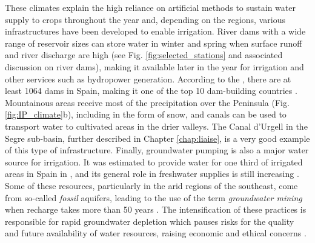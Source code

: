 These climates explain the high reliance on artificial methods to sustain water supply to crops throughout the year and, depending on the regions, various infrastructures have been developed to enable irrigation. 
River dams with a wide range of reservoir sizes can store water in winter and spring when surface runoff and river discharge are high (see Fig. \ref{fig:selected_stations} and associated discussion on river dams), making it available later in the year for irrigation and other services such as hydropower generation.
According to the \citet{ICOLD2020}, there are at least 1064 dams in Spain, making it one of the top 10 dam-building countries \citep{sadki_implementation_2023}.
Mountainous areas receive most of the precipitation over the Peninsula (Fig. \ref{fig:IP_climate}b), including in the form of snow, and canals can be used to transport water to cultivated areas in the drier valleys. The Canal d'Urgell \citep{farran_urgell_2024} in the Segre sub-basin, further described in Chapter \ref{chap:liaise}, is a very good example of this type of infrastructure.
Finally, groundwater pumping is also a major water source for irrigation. It was estimated to provide water for one third of irrigated areas in Spain in \citet{de_stefano_groundwater_2015}, and its general role in freshwater supplies is still increasing \citep{llamas_groundwater_2015}. Some of these resources, particularly in the arid regions of the southeast, come from so-called \textit{fossil} aquifers, leading to the use of the term \textit{groundwater mining} when recharge takes more than 50 years \citep{custodio_groundwater_2016}.
The intensification of these practices is responsible for rapid groundwater depletion which pauses risks for the quality and future availability of water resources, raising economic and ethical concerns \citep{custodio_groundwater_2017}.

